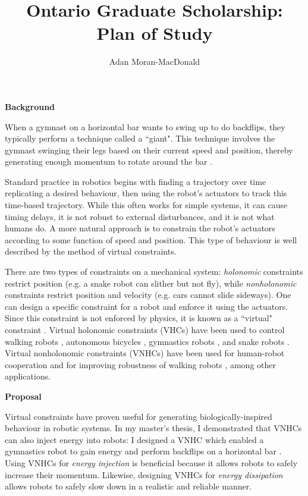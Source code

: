 \documentclass[a4paper,12pt]{article}
\begin{document}
\title{Ontario Graduate Scholarship: Plan of Study}
\author{Adan Moran-MacDonald}
\date{}
\maketitle

\begin{large}
\textbf{Background}
\end{large}

When a gymnast on a horizontal bar wants to swing up to do backflips, they
typically perform a technique called a ``giant".
This technique involves the gymnast swinging their legs based on their current
speed and position, thereby generating enough momentum to rotate around the bar
\cite{pendulum_length_giant_gymnastics}.  

Standard practice in robotics begins with finding a trajectory over time
replicating a desired behaviour, then using the robot's actuators to track this
time-based trajectory. 
While this often works for simple systems, it can cause timing delays, it is not
robust to external disturbances, and it is not what humans do.
A more natural approach is to constrain the robot's actuators according to
some function of speed and position.
This type of behaviour is well described by the method of virtual constraints.

There are two types of constraints on a mechanical system:
\textit{holonomic} constraints restrict position (e.g. a snake robot can slither
but not fly),
while \textit{nonholonomic} constraints restrict position and
velocity (e.g. cars cannot slide sideways).
One can design a specific constraint for a robot and enforce it using the
actuators.
Since this constraint is not enforced by physics, it is known as a ``virtual"
constraint
\cite{vhcs_for_el_systems}.
Virtual holonomic constraints (VHCs) have been used to control walking robots
\cite{stable-walking}, autonomous bicycles \cite{bicycle},
gymnastics robots \cite{xingbo-thesis}, and snake robots \cite{snake-robot}.
Virtual nonholonomic constraints (VNHCs) have been used for human-robot
cooperation \cite{vnhc-human-robot-coop} and for improving robustness of walking
robots \cite{vnhc-biped-robot,hybrid_zero_dynamics_bipedal_nhvcs}, among other
applications.

\begin{large} \textbf{Proposal} \end{large}

Virtual constraints have proven useful for generating biologically-inspired
behaviour in robotic systems.
In my master's thesis, I demonstrated that VNHCs can also inject energy into
robots:
I designed a VNHC which enabled a gymnastics robot to gain energy
and perform backflips on a horizontal bar \cite{my-thesis}.
Using VNHCs for \textit{energy injection} is beneficial because it allows robots to
safely increase their momentum.
Likewise, designing VNHCs for \textit{energy dissipation} allows robots to
safely slow down in a realistic and reliable manner. 
\end{document}
